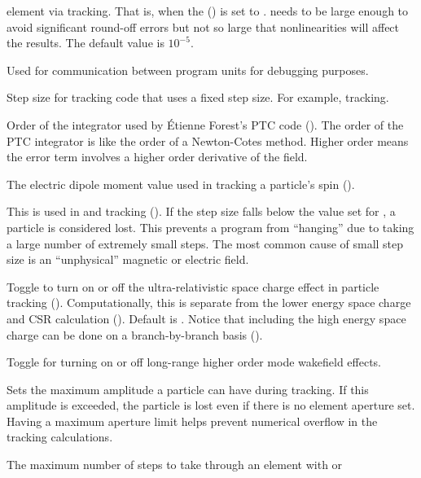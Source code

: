 {\begin{description}
element via tracking. That is, when the  () is set to
.  needs to be large enough to avoid significant round-off errors but not so
large that nonlinearities will affect the results. The default value is $10^{-5}$.
%
\item[\vn{debug}] \Newline
Used for communication between program units for debugging purposes.
%
\item[\vn{default_ds_step}] \Newline
Step size for tracking code  that uses a fixed step
size. For example,  tracking.
%
\item[\vn{default_integ_order}] \Newline
Order of the integrator used by \'Etienne Forest's PTC code ().
The order of the PTC integrator is like the order of a Newton-Cotes method.
Higher order means the error term involves a higher order derivative of the field.
%
\item[\vn{electric_dipole_moment}] \Newline
The electric dipole moment value used in tracking a particle's spin ().
%
\item[\vn{fatal_ds_adaptive_tracking}] \Newline
This is used in  and  tracking
().  If the step size falls below the value set for
, a particle is considered lost.
This prevents a program from ``hanging'' due to taking a large number
of extremely small steps. The most common cause of small step size is
an ``unphysical'' magnetic or electric field.
%
\item[\vn{high_energy_space_charge_on}] \Newline
Toggle to turn on or off the ultra-relativistic space charge effect in particle tracking
(). Computationally, this is separate from the lower energy space charge and
CSR calculation (). Default is . Notice that including the high energy space
charge can be done on a branch-by-branch basis ().
%
\item[\vn{lr_wakes_on}] \Newline
Toggle for turning on or off long-range higher order mode wakefield effects.
%
\item[\vn{max_aperture_limit}] \Newline 
Sets the maximum amplitude a particle can have during tracking. If this amplitude is exceeded, the
particle is lost even if there is no element aperture set. Having a maximum aperture limit helps
prevent numerical overflow in the tracking calculations.
%
\item[\vn{max_num_runge_kutta_step}] \Newline 
The maximum number of steps to take through an element with  or

\end{description}}
